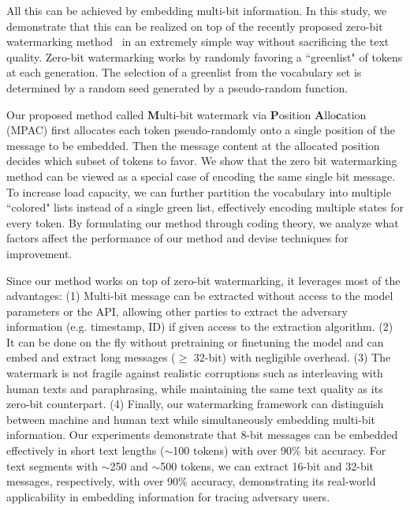 All this can be achieved by embedding multi-bit information. In this study, we demonstrate that this can be realized on top of the recently proposed zero-bit watermarking method~\citep{kirchenbauer2023watermark} in an extremely simple way without sacrificing the text quality. Zero-bit watermarking works by randomly favoring a ``greenlist" of tokens at each generation. The selection of a greenlist from the vocabulary set is determined by a random seed generated by a pseudo-random function. 

Our proposed method called \textbf{M}ulti-bit watermark via \textbf{P}osition \textbf{A}llo\textbf{c}ation (MPAC) first allocates each token pseudo-randomly onto a single position of the message to be embedded. Then the message content at the allocated position decides which subset of tokens to favor. We show that the zero bit watermarking method can be viewed as a special case of encoding the same single bit message. To increase load capacity, we can further partition the vocabulary into multiple ``colored" lists instead of a single green list, effectively encoding multiple states for every token. By formulating our method through coding theory, we analyze what factors affect the performance of our method and devise techniques for improvement. 



Since our method works on top of zero-bit watermarking, it leverages most of the advantages: (1) Multi-bit message can be extracted without access to the model parameters or the API, allowing other parties to extract the adversary information (e.g. timestamp, ID) if given access to the extraction algorithm. (2) It can be done on the fly without pretraining or finetuning the model and can embed and extract long messages ($\geq$ 32-bit) with negligible overhead. (3) The watermark is not fragile against realistic corruptions such as interleaving with human texts and paraphrasing, while maintaining the same text quality as its zero-bit counterpart. (4) Finally, our watermarking framework can distinguish between machine and human text while simultaneously embedding multi-bit information. Our experiments demonstrate that 8-bit messages can be embedded effectively in short text lengths ($\sim$100 tokens) with over 90\% bit accuracy. For text segments with $\sim$250 and $\sim$500 tokens, we can extract 16-bit and 32-bit messages, respectively, with over 90\% accuracy, demonstrating its real-world applicability in embedding information for tracing adversary users. 